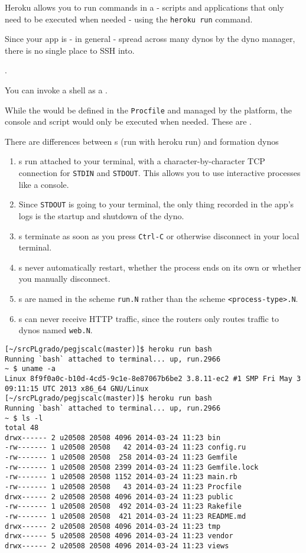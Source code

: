 Heroku allows you to run commands in a  
- scripts and
applications that only need to be executed when needed - using the
\verb|heroku run| command. 

Since your app is - in general - 
spread across many dynos by the dyno manager, there
is no single place to SSH into. 

.

You can invoke a shell as a .

While the  would be defined in the \verb|Procfile| 
and managed by
the platform, the console and script would only be executed when
needed. These are .

There are differences between s (run with heroku run) and formation dynos 

\begin{enumerate}
\item
{}s run attached to your terminal, with a character-by-character
TCP connection for \verb|STDIN| and \verb|STDOUT|. 
This allows you to use interactive
processes like a console. 
\item
Since \verb|STDOUT| is going to your terminal, the
only thing recorded in the app’s logs is the startup and shutdown of
the dyno.
\item
{}s terminate as soon as you press \verb|Ctrl-C| or otherwise
disconnect in your local terminal. 
\item
{}s never automatically
restart, whether the process ends on its own or whether you manually
disconnect.
\item
{}s are named in the scheme \verb|run.N| 
rather than the scheme \verb|<process-type>.N|.
\item
{}s can never receive HTTP traffic, since the routers only
routes traffic to dynos named \verb|web.N|.
\end{enumerate}

\begin{verbatim}
[~/srcPLgrado/pegjscalc(master)]$ heroku run bash
Running `bash` attached to terminal... up, run.2966
~ $ uname -a
Linux 8f9f0a0c-b10d-4cd5-9c1e-8e87067b6be2 3.8.11-ec2 #1 SMP Fri May 3 09:11:15 UTC 2013 x86_64 GNU/Linux
[~/srcPLgrado/pegjscalc(master)]$ heroku run bash
Running `bash` attached to terminal... up, run.2966
~ $ ls -l
total 48
drwx------ 2 u20508 20508 4096 2014-03-24 11:23 bin
-rw------- 1 u20508 20508   42 2014-03-24 11:23 config.ru
-rw------- 1 u20508 20508  258 2014-03-24 11:23 Gemfile
-rw------- 1 u20508 20508 2399 2014-03-24 11:23 Gemfile.lock
-rw------- 1 u20508 20508 1152 2014-03-24 11:23 main.rb
-rw------- 1 u20508 20508   43 2014-03-24 11:23 Procfile
drwx------ 2 u20508 20508 4096 2014-03-24 11:23 public
-rw------- 1 u20508 20508  492 2014-03-24 11:23 Rakefile
-rw------- 1 u20508 20508  421 2014-03-24 11:23 README.md
drwx------ 2 u20508 20508 4096 2014-03-24 11:23 tmp
drwx------ 5 u20508 20508 4096 2014-03-24 11:23 vendor
drwx------ 2 u20508 20508 4096 2014-03-24 11:23 views
\end{verbatim}

